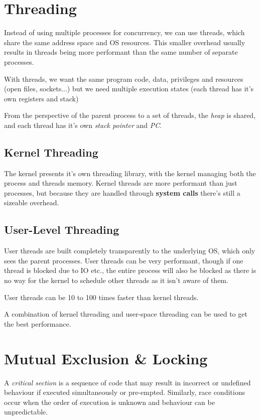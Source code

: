 \documentclass[a4]{article}
\begin{document}
\filbreak
\section{Threading}

Instead of using multiple processes for concurrency, we can use threads, which share the same address
space and OS resources. This smaller overhead usually results in threads being more performant than
the same number of separate processes.

With threads, we want the same program code, data, privileges and resources (open files, sockets...) but
we need multiple execution states (each thread has it's own registers and stack)

From the perspective of the parent process to a set of threads, the \emph{heap} is shared, and each thread has
it's own \emph{stack pointer} and \emph{PC}.

\subsection{Kernel Threading}

The kernel presents it's own threading library, with the kernel managing both the process and threads memory.
Kernel threads are more performant than just processes, but because they are handled through \textbf{system calls}
there's still a sizeable overhead.

\subsection{User-Level Threading}

User threads are built completely transparently to the underlying OS, which only sees the parent processes. User
threads can be very performant, though if one thread is blocked due to IO etc., the entire process will also be
blocked as there is no way for the kernel to schedule other threads as it isn't aware of them.

User threads can be 10 to 100 times faster than kernel threads.

A combination of kernel threading and user-space threading can be used to get the best performance.


\filbreak
\section{Mutual Exclusion \& Locking}

A \emph{critical section} is a sequence of code that may result in
incorrect or undefined behaviour if executed simultaneously or
pre-empted. Similarly, race conditions occur when the order of execution
is unknown and behaviour can be unpredictable.
\end{document}
